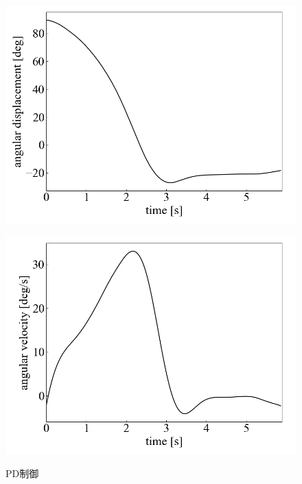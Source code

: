 \begin{figure}[h]
	\centering
	\begin{minipage}{0.43\columnwidth}
	  \centering
	  \includegraphics[width=\columnwidth]{./figure/PDdeg.png}
	  \label{fig:PDdeg}
	\end{minipage}
	\hspace{5mm}
	\begin{minipage}{0.43\columnwidth}
	  \centering
	  \includegraphics[width=\columnwidth]{./figure/PDdegpers.png}
	  \label{fig:PDdegpers}
	\end{minipage}
	\caption{PD制御}
	\label{fig:PD}
  \end{figure}

